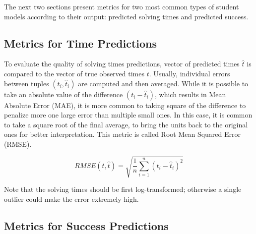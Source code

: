 The next two sections present metrics for two most common
  types of student models according to their output:
  predicted solving times and predicted success.

\subsection{Metrics for Time Predictions}
\label{sec:metrics-for-time-predictions}

To evaluate the quality of solving times predictions,
  vector of predicted times $\hat{t}$ is compared to
  the vector of true observed times $t$.
Usually, individual errors between tuples $(t_i, \hat{t}_i)$ are computed
  and then averaged.
While it is possible to take an absolute value of the
  difference $(t_i - \hat{t}_i)$,
  which results in Mean Absolute Error (MAE),
it is more common to taking square of the difference
  to penalize more one large error than multiple small ones.
In this case, it is common to take a square root of the final
  average, to bring the units back to the original ones
  for better interpretation.
This metric is called Root Mean Squared Error (RMSE).

$$
RMSE(t, \hat{t}) = \sqrt{\frac{1}{n} \sum_{i=1}^n (t_i - \hat{t}_i)^2}
$$

Note that the solving times should be first log-transformed;
  otherwise a single outlier could make the error extremely high.




\subsection{Metrics for Success Predictions}
\label{sec:metrics-for-success-predictions}

